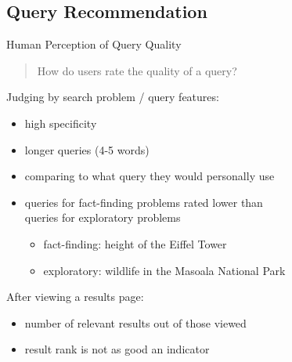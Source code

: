 \subsection{Query Recommendation}


\begin{frame}{Human Perception of Query Quality}

\begin{quote}
How do users rate the quality of a query?
\end{quote}

\vspace{10pt}

Judging by search problem / query features:
	\begin{itemize}
		\item high specificity
		\item longer queries (4-5 words)
		\item comparing to what query they would personally use
		\item queries for fact-finding problems rated lower than\\ queries for
		exploratory problems %
		\begin{itemize}
			\item fact-finding: height of the Eiffel Tower
			\item exploratory: wildlife in the Masoala National Park
		\end{itemize}
	\end{itemize}
After viewing a results page:
	\begin{itemize}
		\item number of relevant results out of those viewed %
		\item result rank is not as good an indicator
	\end{itemize}

\end{frame}

